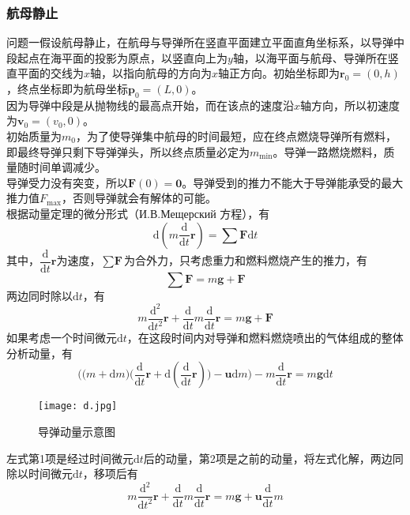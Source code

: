 \documentclass[UTF8]{article}
\begin{document}
\subsubsection{航母静止}
问题一假设航母静止，在航母与导弹所在竖直平面建立平面直角坐标系，以导弹中段起点在海平面的投影为原点，以竖直向上为\(y\)轴，以海平面与航母、导弹所在竖直平面的交线为\(x\)轴，以指向航母的方向为\(x\)轴正方向。初始坐标即为\(\textbf{r}_0=(0,h)\)，终点坐标即为航母坐标\(\textbf{p}_0=(L,0)\)。\\
\indent 因为导弹中段是从抛物线的最高点开始，而在该点的速度沿\(x\)轴方向，所以初速度为\(\textbf{v}_0=(v_0,0)\)。\\
\indent 初始质量为\(m_0\)，为了使导弹集中航母的时间最短，应在终点燃烧导弹所有燃料，即最终导弹只剩下导弹弹头，所以终点质量必定为\(m_\textrm{min}\)。导弹一路燃烧燃料，质量随时间单调减少。\\
\indent 导弹受力没有突变，所以\(\textbf{F}(0)=\textbf{0}\)。导弹受到的推力不能大于导弹能承受的最大推力值\(F_{\textrm{max}}\)，否则导弹就会有解体的可能。\\
\indent 根据动量定理的微分形式（И.В.Мещерский 方程），有
\[\textrm{d}(m\dfrac{\textrm{d}}{\textrm{d}t}\textbf{r})=\sum\textbf{F}\textrm{d}t\]
\indent 其中，\(\dfrac{\textrm{d}}{\textrm{d}t}\textbf{r}\)为速度，\(\sum\textbf{F}\)为合外力，只考虑重力和燃料燃烧产生的推力，有
\[\sum\textbf{F}=m\textbf{g}+\textbf{F}\]
\indent 两边同时除以\(\textrm{d}t\)，有
\begin{equation}
m\dfrac{\textrm{d}^2}{\textrm{d}t^2}\textbf{r}+\dfrac{\textrm{d}}{\textrm{d}t}m\dfrac{\textrm{d}}{\textrm{d}t}\textbf{r}=m\textbf{g}+\textbf{F}
\label{(1)}
\end{equation}
\indent 如果考虑一个时间微元\(\textrm{d}t\)，在这段时间内对导弹和燃料燃烧喷出的气体组成的整体分析动量，有
\[\Big(\big(m+\textrm{d}m\big)\big(\dfrac{\textrm{d}}{\textrm{d}t}\textbf{r}+\textrm{d}(\dfrac{\textrm{d}}{\textrm{d}t}\textbf{r})\big)-\textbf{u}\textrm{d}m\Big)-m\dfrac{\textrm{d}}{\textrm{d}t}\textbf{r}=m\textbf{g}\textrm{d}t\]
\begin{figure}[htbp]
\small
\centering
\texttt{[image: d.jpg]}
\caption{导弹动量示意图}
\end{figure}
\indent 左式第1项是经过时间微元\(\textrm{d}t\)后的动量，第2项是之前的动量，将左式化解，两边同除以时间微元\(\textrm{d}t\)，移项后有
\begin{equation}
m\dfrac{\textrm{d}^2}{\textrm{d}t^2}\textbf{r}+\dfrac{\textrm{d}}{\textrm{d}t}m\dfrac{\textrm{d}}{\textrm{d}t}\textbf{r}=m\textbf{g}+\textbf{u}\dfrac{\textrm{d}}{\textrm{d}t}m
\label{(2)}
\end{equation}
\end{document}
